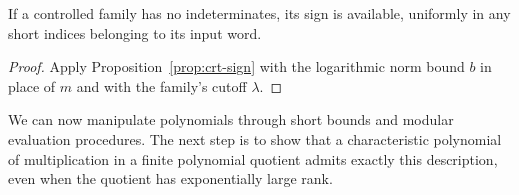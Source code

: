 \begin{corollary}\label{cor:controlled-sign}
If a controlled family has no indeterminates, its sign is available,
uniformly in any short indices belonging to its input word.
\end{corollary}

\begin{proof}
Apply Proposition~\ref{prop:crt-sign} with the logarithmic norm bound
$b$ in place of $m$ and with the family's cutoff $\lambda$.
\end{proof}

We can now manipulate polynomials through short bounds and modular
evaluation procedures.  The next step is to show that a characteristic
polynomial of multiplication in a finite polynomial quotient admits
exactly this description, even when the quotient has exponentially
large rank.
